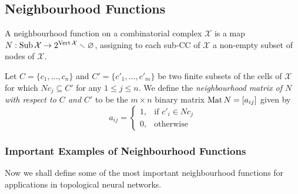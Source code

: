 \subsection{Neighbourhood Functions}

\begin{definition}
\label{def:neighbourhood-function}
A neighbourhood function on a combinatorial complex \(\mathcal{X}\) is a map
\(N: \operatorname{Sub} \mathcal{X} \to 2^{\operatorname{Vert} \mathcal{X}} \smallsetminus \varnothing\), assigning to each sub-CC of \(\mathcal{X}\) a non-empty
subset of nodes of \(\mathcal{X}\).

Let \(C = \{c_1, \dots, c_n\}\) and \(C' = \{c'_1, \dots, c'_m\}\) be two finite
subsets of the cells of \(\mathcal{X}\) for which \(N c_j \subseteq C'\) for any \(1 \leq j \leq n\). We
define the \emph{neighbourhood matrix of \(N\) with respect to \(C\) and \(C'\)}
to be the \(m \times n\) binary matrix \(\operatorname{Mat} N = [a_{i j}]\) given by
\[
a_{i j} =
\begin{cases}
  1, &\text{if } c'_i \in N c_j \\
  0, &\text{otherwise}
\end{cases}
\]
\end{definition}

\subsubsection{Important Examples of Neighbourhood Functions}

Now we shall define some of the most important neighbourhood functions for
applications in topological neural networks.

